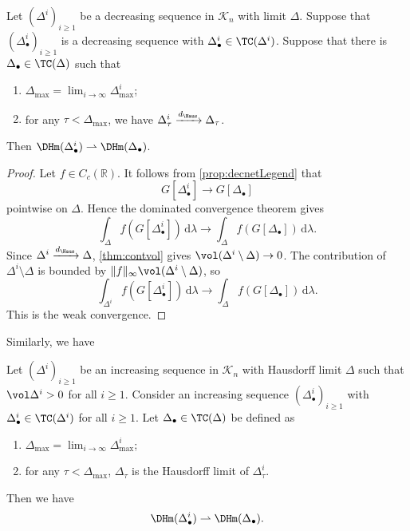 \begin{lemma}\label{lma:DHmconv}
    Let $(\Delta^i)_{i\geq 1}$ be a decreasing sequence in $\mathcal{K}_n$ with limit $\Delta$.
    Suppose that $(\Delta_{\bullet}^i)_{i\geq 1}$ is a decreasing sequence with $\Delta_{\bullet}^i\in \TC(\Delta^i)$.
    Suppose that there is $\Delta_{\bullet}\in \TC(\Delta)$ such that
    \begin{enumerate}
        \item\label{itm:lma:DHmconv:1} $\Delta_{\max}=\lim_{i\to\infty}\Delta^i_{\max}$;
        \item\label{itm:lma:DHmconv:2} for any $\tau<\Delta_{\max}$, we have $\Delta^i_{\tau}\xrightarrow{d_{\Haus}}\Delta_{\tau}$.
    \end{enumerate}
    Then $\DHm(\Delta_{\bullet}^i)\rightharpoonup \DHm(\Delta_{\bullet})$.
\end{lemma}
\begin{proof}
    Let $f\in C_c(\mathbb{R})$. It follows from \cref{prop:decnetLegend} that
    \[
    G[\Delta_{\bullet}^i]\to G[\Delta_{\bullet}]
    \]
    pointwise on $\Delta$.
    Hence the dominated convergence theorem gives
    \[
        \int_{\Delta} f(G[\Delta_{\bullet}^i])\,\mathrm{d}\lambda\to \int_{\Delta} f(G[\Delta_{\bullet}])\,\mathrm{d}\lambda.
    \]
    Since $\Delta^i\xrightarrow{d_{\Haus}}\Delta$, \cref{thm:contvol} gives $\vol(\Delta^i\setminus \Delta)\to 0$. The contribution of $\Delta^i\setminus\Delta$ is bounded by $\|f\|_{\infty}\vol(\Delta^i\setminus\Delta)$, so
    \[
        \int_{\Delta^i} f(G[\Delta_{\bullet}^i])\,\mathrm{d}\lambda\to \int_{\Delta} f(G[\Delta_{\bullet}])\,\mathrm{d}\lambda.
    \]
    This is the weak convergence.
\end{proof}
Similarly, we have
\begin{lemma}\label{lma:DHmconv2}
    Let $(\Delta^i)_{i\geq 1}$ be an increasing sequence in $\mathcal{K}_n$ with Hausdorff limit $\Delta$ such that $\vol \Delta^i>0$ for all $i\geq 1$. Consider an increasing sequence $(\Delta^i_{\bullet})_{i\geq 1}$ with $\Delta^i_{\bullet}\in \TC(\Delta^i)$ for all $i\geq 1$.
    Let $\Delta_{\bullet}\in \TC(\Delta)$ be defined as
    \begin{enumerate}
        \item\label{itm:lma:DHmconv2:1} $\Delta_{\max}=\lim_{i\to\infty}\Delta^i_{\max}$;
        \item\label{itm:lma:DHmconv2:2} for any $\tau<\Delta_{\max}$, $\Delta_{\tau}$ is the Hausdorff limit of $\Delta^i_{\tau}$.
    \end{enumerate}
    Then we have
    \[
    \DHm(\Delta_{\bullet}^i)\rightharpoonup \DHm(\Delta_{\bullet}).
    \]
\end{lemma}
